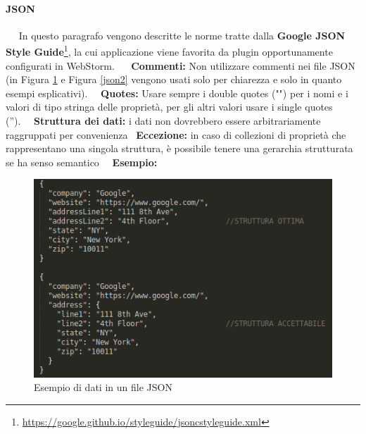 	\paragraph{JSON}~\newline ~\newline
	In questo paragrafo vengono descritte le norme tratte dalla \textbf{Google JSON Style Guide}\footnote{\url{https://google.github.io/styleguide/jsoncstyleguide.xml}}, la cui applicazione viene favorita da plugin opportunamente configurati in WebStorm\pedice. ~\newline ~\newline
	\textbf{Commenti:} Non utilizzare commenti nei file JSON (in Figura \ref{json1} e Figura \ref{json2} vengono usati solo per chiarezza e solo in quanto esempi esplicativi).~\newline ~\newline
	\textbf{Quotes:} Usare sempre i double quotes ("") per i nomi  e i valori di tipo stringa delle proprietà, per gli altri valori usare i single quotes ('').~\newline ~\newline
	\textbf{Struttura dei dati:}  i dati non dovrebbero essere arbitrariamente raggruppati per convenienza~\newline
	\textbf{Eccezione:} in caso di collezioni di proprietà che rappresentano una singola struttura, è possibile tenere una gerarchia strutturata se ha senso semantico~\newline ~\newline
	\textbf{Esempio:}~\newline
	\begin{figure}[!htbp]
		\centering
		\includegraphics[scale=0.8]{datiJson.png}
		\caption{Esempio di dati in un file JSON}
		\label{json1}
	\end{figure}
